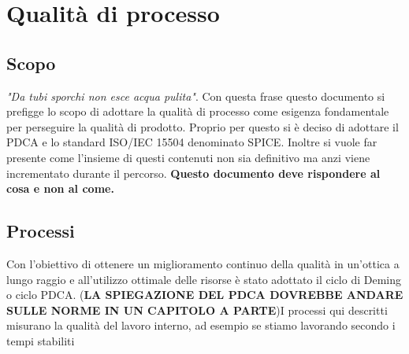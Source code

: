 \section{Qualità di processo}
\subsection{Scopo}
\textit{"Da tubi sporchi non esce acqua pulita"}.
\newline
Con questa frase questo documento si prefigge  lo scopo di adottare la qualità di processo come esigenza fondamentale per perseguire la qualità di prodotto. Proprio per questo si è deciso di adottare il PDCA e lo standard ISO/IEC 15504 denominato SPICE. Inoltre si vuole far presente come l'insieme di questi contenuti non sia definitivo ma anzi viene incrementato durante il percorso. \textbf{Questo documento deve rispondere al cosa e non al come.}
\subsection{Processi}
Con l'obiettivo di ottenere un miglioramento continuo della qualità in un'ottica a lungo raggio e all'utilizzo ottimale delle risorse è stato adottato il ciclo di Deming o ciclo PDCA. (\textbf{LA SPIEGAZIONE DEL PDCA DOVREBBE ANDARE SULLE NORME IN UN CAPITOLO A PARTE})\newline I processi qui descritti misurano la qualità del lavoro interno, ad esempio se stiamo lavorando secondo i tempi stabiliti

